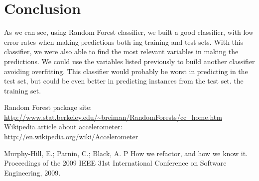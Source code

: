 \documentclass[IEEEtran]{IEEEtran}
\begin{document}
\section{Conclusion}

As we can see, using Random Forest classifier, we built a good classifier, with
low error rates when making predictions both ing training and test sets. With
this classifier, we were also able to find the most relevant variables in
making the predictions. We could use the variables listed previously to build
another classifier avoiding overfitting. This classifier would probably be
worst in predicting in the test set, but could be even better in predicting
instances from the test set.
the training set.


\clearpage
\begin{thebibliography}{24}

 Random Forest package site: \url{http://www.stat.berkeley.edu/~breiman/RandomForests/cc_home.htm}
 Wikipedia article about accelerometer: \url{http://en.wikipedia.org/wiki/Accelerometer}

 Murphy-Hill, E.; Parnin, C.; Black, A. P  How we refactor, and how we know it. 
Proceedings of the 2009 IEEE 31st International Conference on Software Engineering, 2009.

\end{thebibliography}

\end{document}
